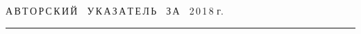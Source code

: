 




\def\stat{cont}


{%




\raggedleft\Large \bf%


А\,В\,Т\,О\,Р\,С\,К\,И\,Й\ \ У\,К\,А\,З\,А\,Т\,Е\,Л\,Ь\ \ З\,А\ \ 2\,0\,1\,8 г. \vskip 17pt


 \hrule


 \par


 }







\label{st\stat}

















\def\leftkol{\ } %


\def\rightkol{\ } %






















\def\leftfootline{\small{\textbf{\thepage}


\hfill СИСТЕМЫ И СРЕДСТВА ИНФОРМАТИКИ\ \ \ выпуск~28\ \ \ №~4\ \ \ 2018}


}%


 \def\rightfootline{\small{СИСТЕМЫ И СРЕДСТВА ИНФОРМАТИКИ\ \ \ выпуск~28\ \ \


№~4\ \ \ 2018


 \hfill \textbf{\thepage}}}





